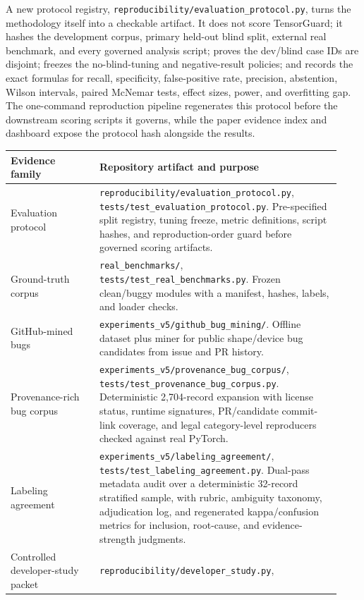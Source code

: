 \documentclass[11pt]{article}
\newcommand{\tg}{TensorGuard}
\begin{document}
A new protocol registry, \texttt{reproducibility/evaluation\_protocol.py},
turns the methodology itself into a checkable artifact.  It does not score
\tg{}; it hashes the development corpus, primary held-out blind split, external
real benchmark, and every governed analysis script; proves the dev/blind case
IDs are disjoint; freezes the no-blind-tuning and negative-result policies; and
records the exact formulas for recall, specificity, false-positive rate,
precision, abstention, Wilson intervals, paired McNemar tests, effect sizes,
power, and overfitting gap.  The one-command reproduction pipeline regenerates
this protocol before the downstream scoring scripts it governs, while the paper
evidence index and dashboard expose the protocol hash alongside the results.

\begin{longtable}{|p{0.25\linewidth}|p{0.68\linewidth}|}
\hline
\textbf{Evidence family} & \textbf{Repository artifact and purpose} \\
\hline
Evaluation protocol &
\texttt{reproducibility/evaluation\_protocol.py},
\texttt{tests/test\_evaluation\_protocol.py}.  Pre-specified split registry,
tuning freeze, metric definitions, script hashes, and reproduction-order guard
before governed scoring artifacts. \\
\hline
Ground-truth corpus &
\texttt{real\_benchmarks/}, \texttt{tests/test\_real\_benchmarks.py}.  Frozen
clean/buggy modules with a manifest, hashes, labels, and loader checks. \\
\hline
GitHub-mined bugs &
\texttt{experiments\_v5/github\_bug\_mining/}.  Offline dataset plus miner for
public shape/device bug candidates from issue and PR history. \\
\hline
Provenance-rich bug corpus &
\texttt{experiments\_v5/provenance\_bug\_corpus/},
\texttt{tests/test\_provenance\_bug\_corpus.py}.  Deterministic 2,704-record
expansion with license status, runtime signatures, PR/candidate commit-link
coverage, and legal category-level reproducers checked against real PyTorch. \\
\hline
Labeling agreement &
\texttt{experiments\_v5/labeling\_agreement/},
\texttt{tests/test\_labeling\_agreement.py}.  Dual-pass metadata audit over a
deterministic 32-record stratified sample, with rubric, ambiguity taxonomy,
adjudication log, and regenerated kappa/confusion metrics for inclusion,
root-cause, and evidence-strength judgments. \\
\hline
Controlled developer-study packet &
\texttt{reproducibility/developer\_study.py},

\end{longtable}
\end{document}
